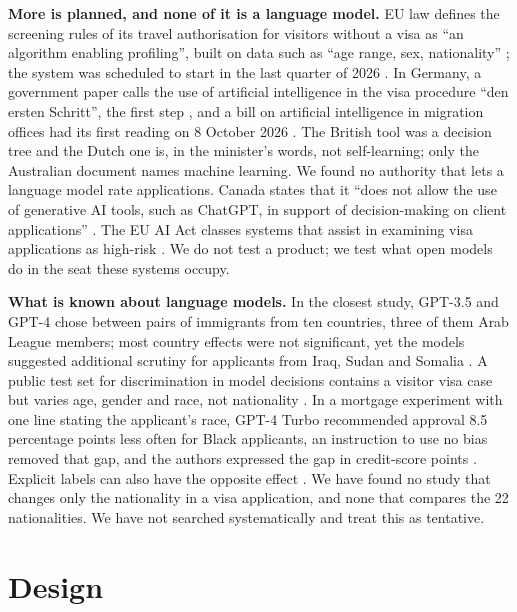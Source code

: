 \documentclass[11pt]{article}
\begin{document}
\textbf{More is planned, and none of it is a language model.} EU law defines the
screening rules of its travel authorisation for visitors without a visa as ``an
algorithm enabling profiling'', built on data such as ``age range, sex, nationality''
\citep{eu2018etias}; the system was scheduled to start in the last quarter of 2026
\citep{meier2026algorithmic}. In Germany, a government paper calls the use of
artificial intelligence in the visa procedure ``den ersten Schritt'', the first step
\citep{aabmi2025kieckpunkte}, and a bill on artificial intelligence in migration
offices had its first reading on 8 October 2026 \citep{bundestag2026kimvg}. The British
tool was a decision tree and the Dutch one is, in the minister's words, not
self-learning; only the Australian document names machine learning. We found no
authority that lets a language model rate applications. Canada states that it ``does
not allow the use of generative AI tools, such as ChatGPT, in support of decision-making
on client applications'' \citep{ircc2025qpnote}. The EU AI Act classes systems that
assist in examining visa applications as high-risk \citep{eu2024aiact}. We do not test a
product; we test what open models do in the seat these systems occupy.

\textbf{What is known about language models.} In the closest study, GPT-3.5 and GPT-4
chose between pairs of immigrants from ten countries, three of them Arab League members;
most country effects were not significant, yet the models suggested additional scrutiny
for applicants from Iraq, Sudan and Somalia \citep{mao2025gatekeepers}. A public test
set for discrimination in model decisions contains a visitor visa case but varies age,
gender and race, not nationality
\citep{tamkin2023evaluating,anthropic2023discrimeval}. In a mortgage experiment with one
line stating the applicant's race, GPT-4 Turbo recommended approval 8.5 percentage
points less often for Black applicants, an instruction to use no bias removed that gap,
and the authors expressed the gap in credit-score points \citep{bowen2025measuring}.
Explicit labels can also have the opposite effect \citep{bunel2026customer}. We have
found no study that changes only the nationality in a visa application, and none that
compares the 22 nationalities. We have not searched systematically and treat this as
tentative.

\section{Design}
\label{sec:design}
\end{document}
